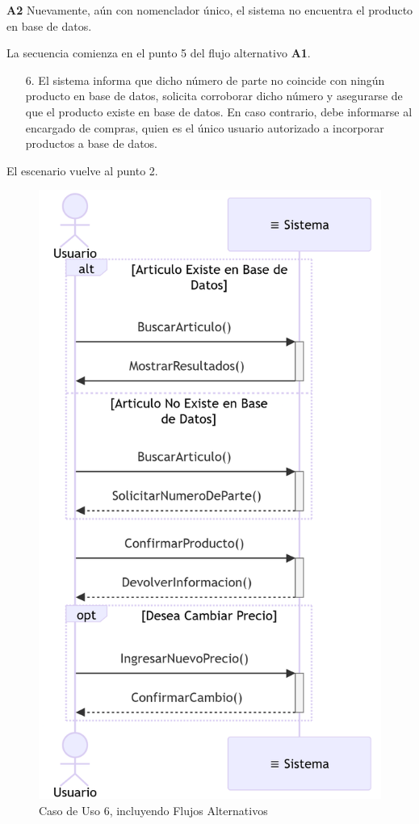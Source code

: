 \textbf{A2} Nuevamente, aún con nomenclador único, el sistema no encuentra el producto en base de datos.

La secuencia comienza en el punto 5 del flujo alternativo \textbf{A1}.

\begin{enumerate}
	\item [6.] El sistema informa que dicho número de parte no coincide con ningún producto en base de datos, 
	solicita corroborar dicho número y asegurarse de que el producto existe en base de datos.
	En caso contrario, debe informarse al encargado de compras, quien es el único usuario autorizado a incorporar productos a base de datos.
\end{enumerate}

El escenario vuelve al punto 2.

\begin{figure}[H]
	\centering
	\vspace{15pt}
	\caption{Caso de Uso 6, incluyendo Flujos Alternativos}
	\vspace{15pt}
	\includegraphics[width=.6\textwidth]{img/04-diagrama-caso-6.png}
	\vspace{15pt}
\end{figure}

